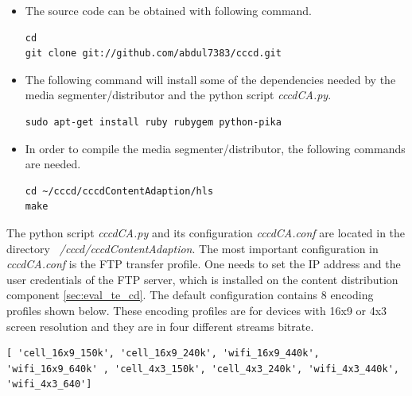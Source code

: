 \begin{itemize}

\item The source code can be obtained with following command.

\begin{code}
\begin{verbatim}
cd
git clone git://github.com/abdul7383/cccd.git
\end{verbatim}
\end{code}

\item The following command will install some of the dependencies needed by the media segmenter/distributor and the python script \textit{cccdCA.py}.

\begin{code}
\begin{verbatim}
sudo apt-get install ruby rubygem python-pika
\end{verbatim}
\end{code}

\item In order to compile the media segmenter/distributor, the following commands are needed.

\begin{code}
\begin{verbatim}
cd ~/cccd/cccdContentAdaption/hls
make
\end{verbatim}
\end{code}

\end{itemize} 

The python script \textit{cccdCA.py} and its configuration \textit{cccdCA.conf} are located in the directory \textit{~/cccd/cccdContentAdaption}. The most important configuration in \textit{ cccdCA.conf}  is the FTP transfer profile. One needs to set the IP address and the user credentials of the FTP server, which is installed on the content distribution component \ref{sec:eval_te_cd}. The default configuration contains 8 encoding profiles shown below. These encoding profiles are for devices with 16x9 or 4x3 screen resolution and they are in four different streams bitrate.

\begin{code}
\begin{verbatim}
[ 'cell_16x9_150k', 'cell_16x9_240k', 'wifi_16x9_440k', 'wifi_16x9_640k' , 'cell_4x3_150k', 'cell_4x3_240k', 'wifi_4x3_440k', 'wifi_4x3_640']
\end{verbatim}
\label{lst:encoding_profiles}
\end{code}

